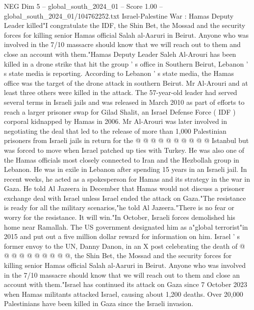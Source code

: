 \begin{textsample}{NEG Dim 5 – global\_south\_2024\_01 – Score 1.00 – global\_south\_2024\_01/104762252.txt}  \label{ex:f5_neg_438}
Israel-Palestine War : Hamas Deputy Leader killed"I congratulate the IDF, the Shin Bet, the Mossad and the security forces for killing senior Hamas official Salah al-Aaruri in Beirut.
Anyone who was involved in the 7/10 massacre should know that we will reach out to them and close an account with them."Hamas Deputy Leader Saleh Al-Arouri has been killed in a drone strike that hit the group ' s office in Southern Beirut, Lebanon ' s state media is reporting.
According to Lebanon ' s state media, the Hamas office was the target of the drone attack in southern Beirut.
Mr Al-Arouri and at least three others were killed in the attack.
The 57-year-old leader had served several terms in Israeli jails and was released in March 2010 as part of efforts to reach a larger prisoner swap for Gilad Shalit, an Israel Defense Force ( IDF ) corporal kidnapped by Hamas in 2006.
Mr Al-Arouri was later involved in negotiating the deal that led to the release of more than 1,000 Palestinian prisoners from Israeli jails in return for the @ @ @ @ @ @ @ @ @ @ Istanbul but was forced to move when Israel patched up ties with Turkey.
He was also one of the Hamas officials most closely connected to Iran and the Hezbollah group in Lebanon.
He was in exile in Lebanon after spending 15 years in an Israeli jail.
In recent weeks, he acted as a spokesperson for Hamas and its strategy in the war in Gaza.
He told Al Jazeera in December that Hamas would not discuss a prisoner exchange deal with Israel unless Israel ended the attack on Gaza."The resistance is ready for all the military scenarios,"he told Al Jazeera."There is no fear or worry for the resistance.
It will win."In October, Israeli forces demolished his home near Ramallah.
The US government designated him as a"global terrorist"in 2015 and put out a five million dollar reward for information on him.
Israel ' s former envoy to the UN, Danny Danon, in an X post celebrating the death of @ @ @ @ @ @ @ @ @ @, the Shin Bet, the Mossad and the security forces for killing senior Hamas official Salah al-Aaruri in Beirut.
Anyone who was involved in the 7/10 massacre should know that we will reach out to them and close an account with them."Israel has continued its attack on Gaza since 7 October 2023 when Hamas militants attacked Israel, causing about 1,200 deaths.
Over 20,000 Palestinians have been killed in Gaza since the Israeli invasion.

\end{textsample}
